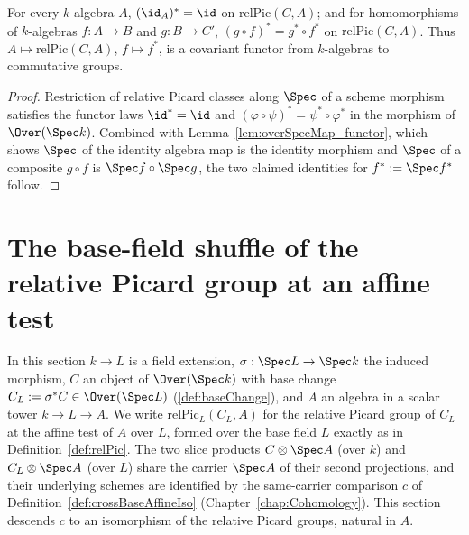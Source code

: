 \begin{lemma}
  \label{lem:relPicAlgMap_functor}
  \leanok
  For every \(k\)-algebra \(A\), \((\id_A)^{*} = \id\) on \(\mathrm{relPic}(C,A)\); and for
  homomorphisms of \(k\)-algebras \(f \colon A \to B\) and \(g \colon B \to C'\),
  \((g \circ f)^{*} = g^{*} \circ f^{*}\) on \(\mathrm{relPic}(C,A)\). Thus
  \(A \mapsto \mathrm{relPic}(C,A)\), \(f \mapsto f^{*}\), is a covariant functor from
  \(k\)-algebras to commutative groups.
\end{lemma}
\begin{proof}
  \leanok
  Restriction of relative Picard classes along \(\Spec\) of a scheme morphism satisfies the
  functor laws \(\id^{*} = \id\) and \((\varphi \circ \psi)^{*} = \psi^{*} \circ \varphi^{*}\)
  in the morphism of \(\Over(\Spec k)\). Combined with
  Lemma~\ref{lem:overSpecMap_functor}, which shows \(\Spec\) of the identity algebra map is the
  identity morphism and \(\Spec\) of a composite \(g \circ f\) is \(\Spec f \circ \Spec g\), the
  two claimed identities for \(f^{*} := \Spec f{}^{*}\) follow.
\end{proof}

\section{The base-field shuffle of the relative Picard group at an affine test}
\label{sec:relPicCrossBase}

In this section \(k \to L\) is a field extension, \(\sigma : \Spec L \to \Spec k\) the
induced morphism, \(C\) an object of \(\Over(\Spec k)\) with base change
\(C_L := \sigma^{*}C \in \Over(\Spec L)\) (\ref{def:baseChange}), and \(A\) an algebra
in a scalar tower \(k \to L \to A\). We write \(\mathrm{relPic}_L(C_L, A)\) for the
relative Picard group of \(C_L\) at the affine test of \(A\) over \(L\), formed over
the base field \(L\) exactly as in Definition~\ref{def:relPic}. The two slice products
\(C \otimes \Spec A\) (over \(k\)) and \(C_L \otimes \Spec A\) (over \(L\)) share the
carrier \(\Spec A\) of their second projections, and their underlying schemes are
identified by the same-carrier comparison \(c\) of
Definition~\ref{def:crossBaseAffineIso}
(Chapter~\ref{chap:Cohomology}). This section descends \(c\) to an isomorphism of the
relative Picard groups, natural in \(A\).

